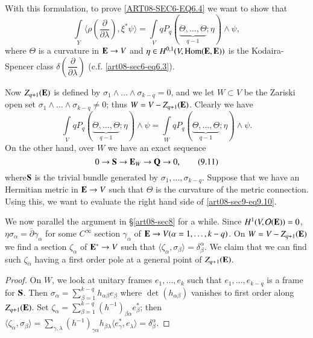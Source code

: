 With this formulation, to prove \eqref{ART08-SEC6-EQ6.4} we want to show that
\begin{equation*}
\int\limits_{Y}\langle \rho\left(\dfrac{\partial}{\partial\lambda}\right),\xi^{*}\psi\rangle =\int\limits_{V}qP_{q}(\underbrace{\Theta,\ldots,\Theta}_{q-1};\eta)\wedge \psi,\tag{9.9}\label{art08-sec9-eq9.9}
\end{equation*}
where $\Theta$ is a curvature in $\mathbf{E}\to V$ and $\eta\in H^{0,1}(V,\operatorname{\mathrm{Hom}}(\mathbf{E},\mathbf{E}))$ is the Kodaira-Spencer class $\delta\left(\dfrac{\partial}{\partial\lambda}\right)$ (c.f. \eqref{art08-sec6-eq6.3}).

Now $Z_{q+1}(\mathbf{E})$ is defined by $\sigma_{1}\wedge\ldots\wedge \sigma_{k-q}=0$, and we let $W\subset V$ be the Zariski open set $\sigma_{1}\wedge\ldots\wedge \sigma_{k-q}\neq 0$; thus $W=V-Z_{q+1}(\mathbf{E})$. Clearly we have
\begin{equation*}
\int\limits_{V}qP_{q}(\underbrace{\Theta,\ldots,\Theta}_{q-1};\eta)\wedge \psi=\int\limits_{W}qP_{q}(\underbrace{\Theta,\ldots,\Theta}_{q-1};\eta)\wedge\psi.\tag{9.10}\label{art08-sec9-eq9.10}
\end{equation*}
On the other hand, over $W$ we have an exact sequence 
\begin{equation*}
0\to \mathbf{S}\to \mathbf{E}_{W}\to \mathbf{Q}\to 0,\tag{9.11}\label{art08-sec9-eq9.11}
\end{equation*}
where\pageoriginale $\mathbf{S}$ is the trivial bundle generated by $\sigma_{1},\ldots,\sigma_{k-q}$. Suppose that we have an Hermitian metric in $\mathbf{E}\to V$ such that $\Theta$ is the curvature of the metric connection. Using this, we want to evaluate the right hand side of \eqref{art08-sec9-eq9.10}.

We now parallel the argument in \S\ref{art08-sec8} for a while. Since $H^{1}(V,\mathcal{O}(\mathbf{E}))=0$, $\eta\sigma_{\alpha}=\overline{\partial}\gamma_{\alpha}$ for some $C^{\infty}$ section $\gamma_{\alpha}$ of $\mathbf{E}\to V(\alpha=1,\ldots,k-q)$. On $W=V-Z_{q+1}(\mathbf{E})$ we find a section $\zeta_{\alpha}$ of $\mathbf{E}^{*}\to V$ such that $\langle \zeta_{\alpha},\sigma_{\beta}\rangle=\delta^{\alpha}_{\beta}$. We claim that we can find such $\zeta_{\alpha}$ having a first order pole at a general point of $Z_{q+1}(\mathbf{E})$.

\begin{proof}
On $W$, we look at unitary frames $e_{1},\ldots,e_{k}$ such that $e_{1},\ldots,e_{k-q}$ is a frame for $\mathbf{S}$. Then $\sigma_{\alpha}=\sum\limits^{k-q}_{\beta=1}h_{\alpha\beta}e_{\beta}$ where $\det (h_{\alpha\beta})$ vanishes to first order along $Z_{q+1}(\mathbf{E})$. Set $\zeta_{\alpha}=\sum\limits^{k-q}_{\beta=1}(h^{-1})_{\beta\alpha}e^{*}_{\beta}$; then $\langle \zeta_{\alpha},\sigma_{\beta}\rangle =\sum\limits_{\gamma,\lambda}(h^{-1})_{\gamma\alpha}h_{\beta\lambda}\langle e^{*}_{\gamma},e_{\lambda}\rangle=\delta^{\alpha}_{\beta}$.
\end{proof}

